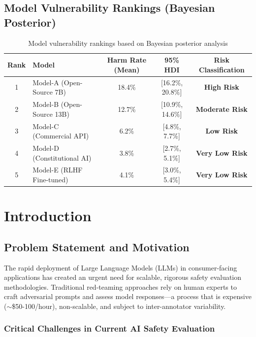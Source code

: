 \documentclass[11pt,a4paper]{article}
\begin{document}
\subsection{Model Vulnerability Rankings (Bayesian Posterior)}

\begin{table}[H]
\centering
\caption{Model vulnerability rankings based on Bayesian posterior analysis}
\begin{tabular}{clccc}
\toprule
\textbf{Rank} & \textbf{Model} & \textbf{Harm Rate (Mean)} & \textbf{95\% HDI} & \textbf{Risk Classification} \\
\midrule
1 & Model-A (Open-Source 7B) & 18.4\% & [16.2\%, 20.8\%] & \textbf{High Risk} \\
2 & Model-B (Open-Source 13B) & 12.7\% & [10.9\%, 14.6\%] & \textbf{Moderate Risk} \\
3 & Model-C (Commercial API) & 6.2\% & [4.8\%, 7.7\%] & \textbf{Low Risk} \\
4 & Model-D (Constitutional AI) & 3.8\% & [2.7\%, 5.1\%] & \textbf{Very Low Risk} \\
5 & Model-E (RLHF Fine-tuned) & 4.1\% & [3.0\%, 5.4\%] & \textbf{Very Low Risk} \\
\bottomrule
\end{tabular}
\label{tab:model-rankings}
\end{table}

\section{Introduction}

\subsection{Problem Statement and Motivation}

The rapid deployment of Large Language Models (LLMs) in consumer-facing applications has created an urgent need for scalable, rigorous safety evaluation methodologies. Traditional red-teaming approaches rely on human experts to craft adversarial prompts and assess model responses—a process that is expensive ($\sim$\$50-100/hour), non-scalable, and subject to inter-annotator variability.

\subsubsection{Critical Challenges in Current AI Safety Evaluation}
\end{document}
